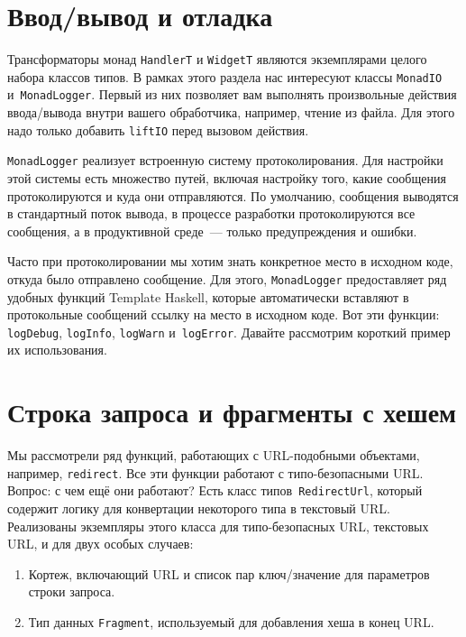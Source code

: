 \section{Ввод/вывод и отладка}
Трансформаторы монад \lstinline'HandlerT' и \lstinline'WidgetT' являются
экземплярами целого набора классов типов. В рамках этого раздела нас интересуют
классы \lstinline'MonadIO' и~\lstinline'MonadLogger'. Первый из них позволяет
вам выполнять произвольные действия ввода/вывода внутри вашего обработчика,
например, чтение из файла. Для этого надо только добавить \lstinline'liftIO'
перед вызовом действия.

\lstinline'MonadLogger' реализует встроенную систему протоколирования. Для
настройки этой системы есть множество путей, включая настройку того, какие
сообщения протоколируются и куда они отправляются. По умолчанию, сообщения
выводятся в стандартный поток вывода, в процессе разработки протоколируются все
сообщения, а в продуктивной среде~--- только предупреждения и ошибки.

Часто при протоколировании мы хотим знать конкретное место в исходном коде,
откуда было отправлено сообщение. Для этого, \lstinline'MonadLogger'
предоставляет ряд удобных функций Template Haskell, которые автоматически
вставляют в протокольные сообщений ссылку на место в исходном коде. Вот эти
функции: \lstinline'logDebug', \lstinline'logInfo', \lstinline'logWarn'
и~\lstinline'logError'. Давайте рассмотрим короткий пример их использования.


\section{Строка запроса и фрагменты с хешем}
Мы рассмотрели ряд функций, работающих с URL-подобными объектами, например,
\lstinline'redirect'. Все эти функции работают с типо-безопасными URL. Вопрос: с чем
ещё они работают? Есть класс типов~\lstinline'RedirectUrl', который содержит
логику для конвертации некоторого типа в текстовый URL. Реализованы экземпляры
этого класса для типо-безопасных URL, текстовых URL, и для двух особых случаев:
\begin{enumerate}
    \item Кортеж, включающий URL и список пар ключ/значение для параметров
        строки запроса.

    \item Тип данных \lstinline'Fragment', используемый для добавления
        хеша в конец URL.
\end{enumerate}


